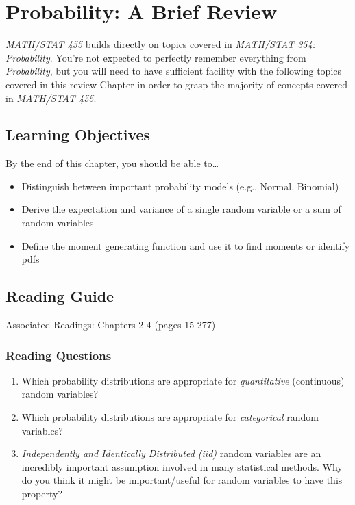\documentclass[
  letterpaper,
  DIV=11,
  numbers=noendperiod]{scrreprt}
\begin{document}

\hypertarget{probability-a-brief-review}{%
\chapter{Probability: A Brief Review}\label{probability-a-brief-review}}

\emph{MATH/STAT 455} builds directly on topics covered in
\emph{MATH/STAT 354: Probability}. You're not expected to perfectly
remember everything from \emph{Probability}, but you will need to have
sufficient facility with the following topics covered in this review
Chapter in order to grasp the majority of concepts covered in
\emph{MATH/STAT 455}.

\hypertarget{learning-objectives}{%
\section{Learning Objectives}\label{learning-objectives}}

By the end of this chapter, you should be able to\ldots{}

\begin{itemize}
\item
  Distinguish between important probability models (e.g., Normal,
  Binomial)
\item
  Derive the expectation and variance of a single random variable or a
  sum of random variables
\item
  Define the moment generating function and use it to find moments or
  identify pdfs
\end{itemize}

\hypertarget{reading-guide}{%
\section{Reading Guide}\label{reading-guide}}

Associated Readings: Chapters 2-4 (pages 15-277)

\hypertarget{reading-questions}{%
\subsection{Reading Questions}\label{reading-questions}}

\begin{enumerate}
\def\labelenumi{\arabic{enumi}.}
\item
  Which probability distributions are appropriate for
  \emph{quantitative} (continuous) random variables?
\item
  Which probability distributions are appropriate for \emph{categorical}
  random variables?
\item
  \emph{Independently and Identically Distributed (iid)} random
  variables are an incredibly important assumption involved in many
  statistical methods. Why do you think it might be important/useful for
  random variables to have this property?
\end{enumerate}
\end{document}
